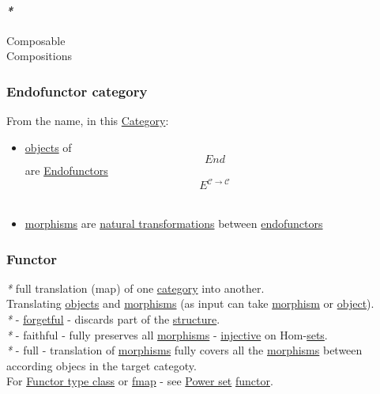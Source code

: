 \documentclass[11pt]{article}
\begin{document}
\paragraph{\emph{*}}
\label{sec:orgb141040}

\label{org37ac081}Composable\\
\label{org0500389}Compositions\\

\subsubsection{\label{org8a9f95a}Endofunctor category}
\label{sec:org23f6ada}
From the name, in this \hyperref[org3e3a79b]{Category}:\\
\begin{itemize}
\item \hyperref[orge0f000f]{objects} of $$ End $$ are \hyperref[org1a8cedf]{Endofunctors} $$ E^{\mathcal{C \to C}} $$\\
\item \hyperref[org8ed0ce8]{morphisms} are \hyperref[org740b530]{natural transformations} between \hyperref[org1a8cedf]{endofunctors}\\
\end{itemize}

\subsubsection{\label{org6073683}Functor}
\label{sec:org8b5f5ab}
\emph{*} full translation (map) of one \hyperref[org3e3a79b]{category} into another.\\
Translating \hyperref[orge0f000f]{objects} and \hyperref[org8ed0ce8]{morphisms} (as input can take \hyperref[orgad99fc6]{morphism} or \hyperref[org025aac8]{object}).\\

\emph{*} - \hyperref[orga913e66]{forgetful} - discards part of the \hyperref[org93ee82c]{structure}.\\
\emph{*} - faithful - fully preserves all \hyperref[org8ed0ce8]{morphisms} - \hyperref[orgbdf10ff]{injective} on Hom-\hyperref[org4e7443a]{sets}.\\
\emph{*} - full - translation of \hyperref[org8ed0ce8]{morphisms} fully covers all the \hyperref[org8ed0ce8]{morphisms} between according objecs in the target categoty.\\

For \hyperref[org0e7b59c]{Functor type class} or \hyperref[org48f5bd6]{fmap} - see \hyperref[org05c8b9e]{Power set} \hyperref[org6073683]{functor}.\\
\end{document}
